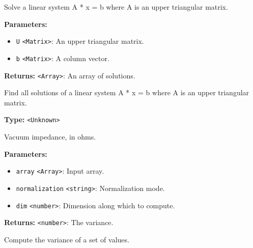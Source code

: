 \documentclass[12pt,a4paper]{article}
\begin{document}
\noindent Solve a linear system A * x = b where A is an upper triangular matrix.

\vspace{5mm}
\noindent {}


\noindent \textbf{Parameters:}
\begin{itemize}
  \item \texttt{U} \texttt{<Matrix>}: An upper triangular matrix.
  \item \texttt{b} \texttt{<Matrix>}: A column vector.
\end{itemize}

\noindent \textbf{Returns:} \texttt{<Array>}: An array of solutions.

\noindent Find all solutions of a linear system A * x = b where A is an upper triangular matrix.

\vspace{5mm}
\noindent {}\vspace{4mm}


\noindent \textbf{Type:} \texttt{<Unknown>}

\noindent Vacuum impedance, in ohms.

\vspace{5mm}
\noindent {}


\noindent \textbf{Parameters:}
\begin{itemize}
  \item \texttt{array} \texttt{<Array>}: Input array.
  \item \texttt{normalization} \texttt{<string>}: Normalization mode.
  \item \texttt{dim} \texttt{<number>}: Dimension along which to compute.
\end{itemize}

\noindent \textbf{Returns:} \texttt{<number>}: The variance.

\noindent Compute the variance of a set of values.

\vspace{5mm}
\noindent {}\vspace{4mm}
\end{document}
